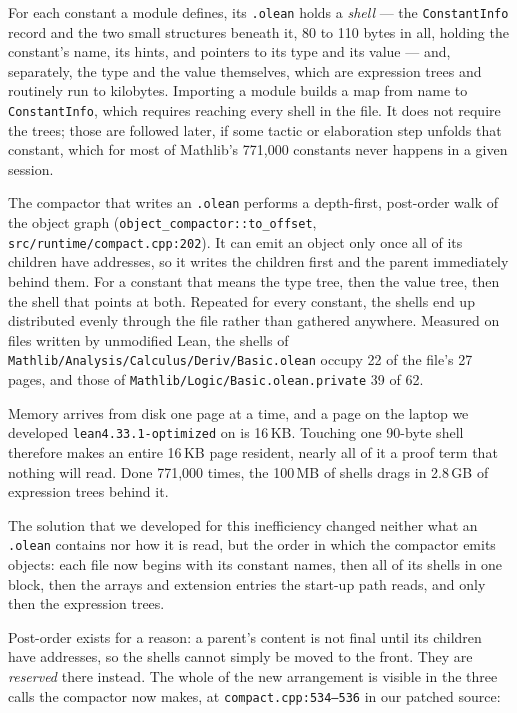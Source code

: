 \documentclass{article}
\newcommand{\Lean}{Lean\xspace}      %
\newcommand{\mathlib}{Mathlib\xspace}
\newcommand{\altlean}{\texttt{lean4.33.1-\allowbreak optimized}\xspace}
\begin{document}
For each constant a module defines, its \texttt{.olean} holds a \emph{shell} --- the \texttt{ConstantInfo} record and the two small structures beneath it, 80 to 110 bytes in all, holding the constant's name, its hints, and pointers to its type and its value --- and, separately, the type and the value themselves, which are expression trees and routinely run to kilobytes. Importing a module builds a map from name to \texttt{ConstantInfo}, which requires reaching every shell in the file. It does not require the trees; those are followed later, if some tactic or elaboration step unfolds that constant, which for most of \mathlib's 771{,}000 constants never happens in a given session.

The compactor that writes an \texttt{.olean} performs a depth-first, post-order walk of the object graph (\texttt{object\_compactor::to\_offset}, \texttt{src/runtime/compact.cpp:202}). It can emit an object only once all of its children have addresses, so it writes the children first and the parent immediately behind them. For a constant that means the type tree, then the value tree, then the shell that points at both. Repeated for every constant, the shells end up distributed evenly through the file rather than gathered anywhere. Measured on files written by unmodified \Lean, the shells of \texttt{Mathlib/\allowbreak Analysis/\allowbreak Calculus/\allowbreak Deriv/\allowbreak Basic.olean} occupy 22 of the file's 27 pages, and those of \texttt{Mathlib/Logic/Basic.olean.private} 39 of 62.

Memory arrives from disk one page at a time, and a page on the laptop we developed \altlean on is 16\,KB. Touching one 90-byte shell therefore makes an entire 16\,KB page resident, nearly all of it a proof term that nothing will read. Done 771{,}000 times, the 100\,MB of shells drags in 2.8\,GB of expression trees behind it.

The solution that we developed for this inefficiency changed neither what an \texttt{.olean} contains nor how it is read, but the order in which the compactor emits objects: each file now begins with its constant names, then all of its shells in one block, then the arrays and extension entries the start-up path reads, and only then the expression trees.

Post-order exists for a reason: a parent's content is not final until its children have addresses, so the shells cannot simply be moved to the front. They are \emph{reserved} there instead. The whole of the new arrangement is visible in the three calls the compactor now makes, at \texttt{compact.cpp:534--536} in our patched source:
\end{document}
